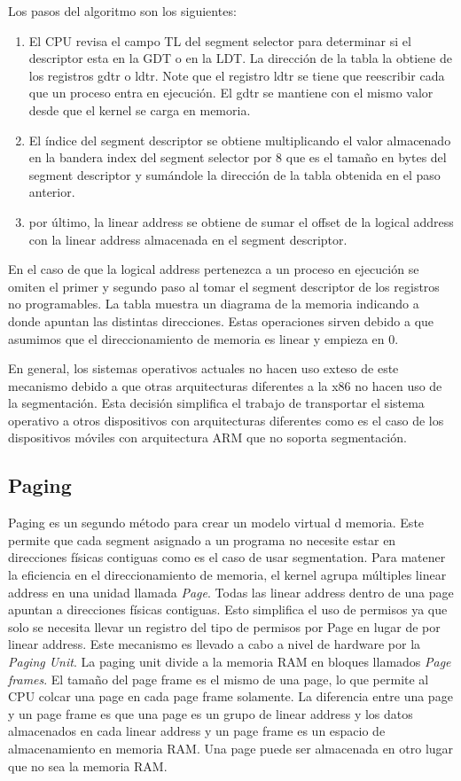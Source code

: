 Los pasos del algoritmo son los siguientes:
\begin{enumerate}
\item El CPU revisa el campo TL del segment selector para determinar si el
descriptor esta en la GDT o en la LDT. La dirección de la tabla la obtiene de
los registros gdtr o ldtr. Note que el registro ldtr se tiene que reescribir
cada que un proceso entra en ejecución. El gdtr se mantiene con el mismo valor
desde que el kernel se carga en memoria.
\item El índice del segment descriptor se obtiene multiplicando el valor
almacenado en la bandera index del segment selector por 8 que es el tamaño en
bytes del segment descriptor y sumándole la dirección de la tabla obtenida en
el paso anterior.
\item por último, la linear address se obtiene de sumar el offset de la logical
address con la linear address almacenada en el segment descriptor.
\end{enumerate} En el caso de que la logical address pertenezca a un proceso en
ejecución se omiten el primer y segundo paso al tomar el segment descriptor de
los registros no programables. La tabla {} muestra un diagrama de la memoria
indicando a donde apuntan las distintas direcciones. Estas operaciones sirven
debido a que asumimos que el direccionamiento de memoria es linear y empieza en
0.


En general, los sistemas operativos actuales no hacen uso exteso de este
mecanismo debido a que otras arquitecturas diferentes a la x86 no hacen uso de
la segmentación. Esta decisión simplifica el trabajo de transportar el sistema
operativo a otros dispositivos con arquitecturas diferentes como es el caso de
los dispositivos móviles con arquitectura ARM que no soporta segmentación.

\subsection{Paging} Paging es un segundo método para crear un modelo virtual d
memoria. Este permite que cada segment asignado a un programa no necesite estar
en direcciones físicas contiguas como es el caso de usar segmentation. Para
matener la eficiencia en el direccionamiento de memoria, el kernel agrupa
múltiples linear address en una unidad llamada \emph{Page}. Todas las linear
address dentro de una page apuntan a direcciones físicas contiguas. Esto
simplifica el uso de permisos ya que solo se necesita llevar un registro del
tipo de permisos por Page en lugar de por linear address. Este mecanismo es
llevado a cabo a nivel de hardware por la \emph{Paging Unit}. La paging unit
divide a la memoria RAM en bloques llamados \emph{Page frames}. El tamaño del
page frame es el mismo de una page, lo que permite al CPU colcar una page en
cada page frame solamente. La diferencia entre una page y un page frame es que
una page es un grupo de linear address y los datos almacenados en cada linear
address y un page frame es un espacio de almacenamiento en memoria RAM. Una
page puede ser almacenada en otro lugar que no sea la memoria RAM.

